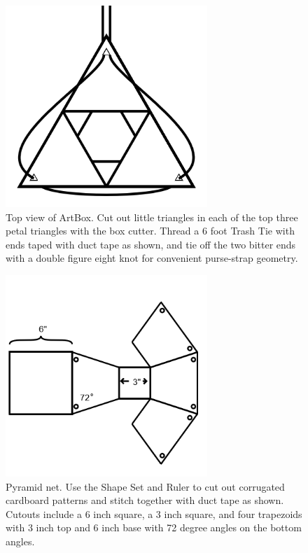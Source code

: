 \begin{figure}
	\centering
	\includegraphics[width=3in]{figures/actiongeometry/artboxtop.png}
	\caption[artboxtop]
	{Top view of ArtBox.  Cut out little triangles in each of the top three petal triangles with the box cutter.  Thread a 6 foot Trash Tie with ends taped with duct tape as shown, and tie off the two bitter ends with a double figure eight knot for convenient purse-strap geometry.}
\end{figure}


\begin{figure}
	\centering
	\includegraphics[width=3in]{figures/actiongeometry/pyramidnet.png}
	\caption[pyramidnet]
	{Pyramid net.  Use the Shape Set and Ruler to cut out corrugated cardboard patterns and stitch together with duct tape as shown.  Cutouts include a 6 inch square, a 3 inch square, and four trapezoids with 3 inch top and 6 inch base with 72 degree angles on the bottom angles.}
\end{figure}

